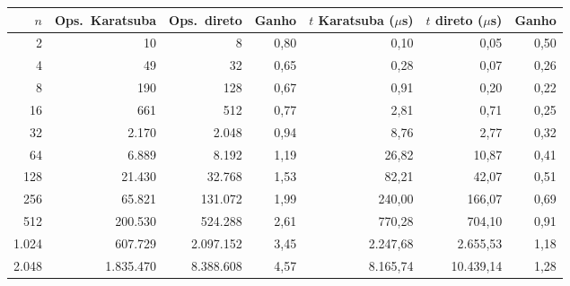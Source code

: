 \begin{tabular}{rrrrrrr}
\toprule
$n$ & Ops.\ Karatsuba & Ops.\ direto & Ganho & $t$ Karatsuba ($\mu$s) & $t$ direto ($\mu$s) & Ganho \\
\midrule
2 & 10 & 8 & 0,80 & 0,10 & 0,05 & 0,50 \\
4 & 49 & 32 & 0,65 & 0,28 & 0,07 & 0,26 \\
8 & 190 & 128 & 0,67 & 0,91 & 0,20 & 0,22 \\
16 & 661 & 512 & 0,77 & 2,81 & 0,71 & 0,25 \\
32 & 2.170 & 2.048 & 0,94 & 8,76 & 2,77 & 0,32 \\
64 & 6.889 & 8.192 & 1,19 & 26,82 & 10,87 & 0,41 \\
128 & 21.430 & 32.768 & 1,53 & 82,21 & 42,07 & 0,51 \\
256 & 65.821 & 131.072 & 1,99 & 240,00 & 166,07 & 0,69 \\
512 & 200.530 & 524.288 & 2,61 & 770,28 & 704,10 & 0,91 \\
1.024 & 607.729 & 2.097.152 & 3,45 & 2.247,68 & 2.655,53 & 1,18 \\
2.048 & 1.835.470 & 8.388.608 & 4,57 & 8.165,74 & 10.439,14 & 1,28 \\
\bottomrule
\end{tabular}
